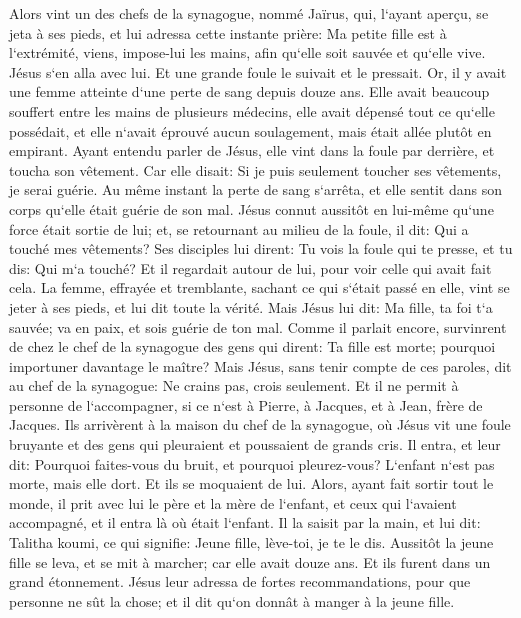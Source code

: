 \verse Alors vint un des chefs de la synagogue, nommé Jaïrus, qui, l`ayant aperçu, se jeta à ses pieds, 
\verse et lui adressa cette instante prière: Ma petite fille est à l`extrémité, viens, impose-lui les mains, afin qu`elle soit sauvée et qu`elle vive. 
\verse Jésus s`en alla avec lui. Et une grande foule le suivait et le pressait. 
\verse Or, il y avait une femme atteinte d`une perte de sang depuis douze ans. 
\verse Elle avait beaucoup souffert entre les mains de plusieurs médecins, elle avait dépensé tout ce qu`elle possédait, et elle n`avait éprouvé aucun soulagement, mais était allée plutôt en empirant. 
\verse Ayant entendu parler de Jésus, elle vint dans la foule par derrière, et toucha son vêtement. 
\verse Car elle disait: Si je puis seulement toucher ses vêtements, je serai guérie. 
\verse Au même instant la perte de sang s`arrêta, et elle sentit dans son corps qu`elle était guérie de son mal. 
\verse Jésus connut aussitôt en lui-même qu`une force était sortie de lui; et, se retournant au milieu de la foule, il dit: Qui a touché mes vêtements? 
\verse Ses disciples lui dirent: Tu vois la foule qui te presse, et tu dis: Qui m`a touché? 
\verse Et il regardait autour de lui, pour voir celle qui avait fait cela. 
\verse La femme, effrayée et tremblante, sachant ce qui s`était passé en elle, vint se jeter à ses pieds, et lui dit toute la vérité. 
\verse Mais Jésus lui dit: Ma fille, ta foi t`a sauvée; va en paix, et sois guérie de ton mal. 
\verse Comme il parlait encore, survinrent de chez le chef de la synagogue des gens qui dirent: Ta fille est morte; pourquoi importuner davantage le maître? 
\verse Mais Jésus, sans tenir compte de ces paroles, dit au chef de la synagogue: Ne crains pas, crois seulement. 
\verse Et il ne permit à personne de l`accompagner, si ce n`est à Pierre, à Jacques, et à Jean, frère de Jacques. 
\verse Ils arrivèrent à la maison du chef de la synagogue, où Jésus vit une foule bruyante et des gens qui pleuraient et poussaient de grands cris. 
\verse Il entra, et leur dit: Pourquoi faites-vous du bruit, et pourquoi pleurez-vous? L`enfant n`est pas morte, mais elle dort. 
\verse Et ils se moquaient de lui. Alors, ayant fait sortir tout le monde, il prit avec lui le père et la mère de l`enfant, et ceux qui l`avaient accompagné, et il entra là où était l`enfant. 
\verse Il la saisit par la main, et lui dit: Talitha koumi, ce qui signifie: Jeune fille, lève-toi, je te le dis. 
\verse Aussitôt la jeune fille se leva, et se mit à marcher; car elle avait douze ans. Et ils furent dans un grand étonnement. 
\verse Jésus leur adressa de fortes recommandations, pour que personne ne sût la chose; et il dit qu`on donnât à manger à la jeune fille. 

